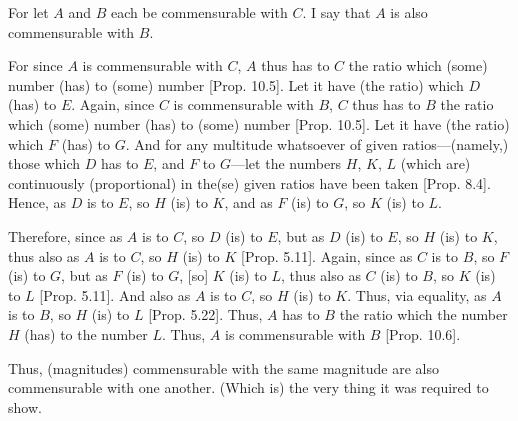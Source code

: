 \begin{Parallel}{}{}
{For let $A$ and $B$ each be commensurable with $C$. I say that
$A$ is also commensurable with $B$.

For since $A$ is commensurable with $C$, $A$ thus has to $C$ the
ratio which (some) number (has) to (some) number [Prop. 10.5]. Let it have (the ratio) which $D$ (has)
to $E$. Again, since $C$ is commensurable with $B$, $C$ thus has to $B$
the ratio which (some) number (has) to (some) number [Prop. 10.5].  Let it have (the ratio) which $F$ (has) to $G$. And for any multitude whatsoever of given ratios---(namely,) those
which $D$ has to $E$, and $F$ to $G$---let the numbers $H$, $K$, $L$
(which are) continuously (proportional) in the(se) given ratios have been taken [Prop. 8.4]. Hence, as $D$ is to $E$, so $H$ (is) to $K$, and as $F$ (is) to $G$, so $K$ (is) to $L$.

\centerline{}

Therefore, since as $A$ is to $C$, so $D$ (is) to $E$, but as $D$ (is) to 
$E$, so $H$ (is) to $K$, thus also as $A$ is to $C$, so $H$ (is) to $K$
[Prop. 5.11]. Again, since as $C$ is to $B$, 
so $F$ (is) to $G$, but as $F$ (is) to $G$, [so] $K$ (is) to $L$, 
thus also as $C$ (is) to $B$, so $K$ (is) to $L$ [Prop. 5.11]. And also as $A$ is to $C$, so $H$ (is) to $K$. Thus, via equality, as $A$ is to $B$, so $H$ (is) to $L$ [Prop. 5.22]. Thus, $A$ has to $B$ the ratio
which the number $H$ (has) to the number $L$. Thus, $A$ is commensurable
with $B$ [Prop. 10.6].

Thus, (magnitudes) commensurable with the same magnitude are also commensurable with one another. (Which is) the very thing it was required
to show.}
\end{Parallel}

